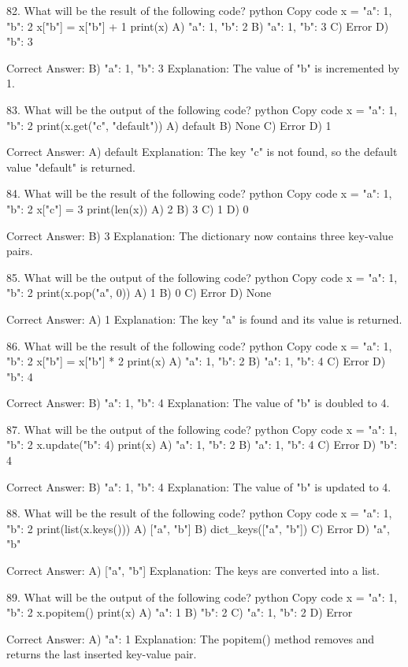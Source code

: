 82. What will be the result of the following code?
python
Copy code
x = {"a": 1, "b": 2}
x["b"] = x["b"] + 1
print(x)
A) {"a": 1, "b": 2}
B) {"a": 1, "b": 3}
C) Error
D) {"b": 3}

Correct Answer: B) {"a": 1, "b": 3}
Explanation: The value of "b" is incremented by 1.

83. What will be the output of the following code?
python
Copy code
x = {"a": 1, "b": 2}
print(x.get("c", "default"))
A) default
B) None
C) Error
D) 1

Correct Answer: A) default
Explanation: The key "c" is not found, so the default value "default" is returned.

84. What will be the result of the following code?
python
Copy code
x = {"a": 1, "b": 2}
x["c"] = 3
print(len(x))
A) 2
B) 3
C) 1
D) 0

Correct Answer: B) 3
Explanation: The dictionary now contains three key-value pairs.

85. What will be the output of the following code?
python
Copy code
x = {"a": 1, "b": 2}
print(x.pop("a", 0))
A) 1
B) 0
C) Error
D) None

Correct Answer: A) 1
Explanation: The key "a" is found and its value is returned.

86. What will be the result of the following code?
python
Copy code
x = {"a": 1, "b": 2}
x["b"] = x["b"] * 2
print(x)
A) {"a": 1, "b": 2}
B) {"a": 1, "b": 4}
C) Error
D) {"b": 4}

Correct Answer: B) {"a": 1, "b": 4}
Explanation: The value of "b" is doubled to 4.

87. What will be the output of the following code?
python
Copy code
x = {"a": 1, "b": 2}
x.update({"b": 4})
print(x)
A) {"a": 1, "b": 2}
B) {"a": 1, "b": 4}
C) Error
D) {"b": 4}

Correct Answer: B) {"a": 1, "b": 4}
Explanation: The value of "b" is updated to 4.

88. What will be the result of the following code?
python
Copy code
x = {"a": 1, "b": 2}
print(list(x.keys()))
A) ["a", "b"]
B) dict_keys(["a", "b"])
C) Error
D) {"a", "b"}

Correct Answer: A) ["a", "b"]
Explanation: The keys are converted into a list.

89. What will be the output of the following code?
python
Copy code
x = {"a": 1, "b": 2}
x.popitem()
print(x)
A) {"a": 1}
B) {"b": 2}
C) {"a": 1, "b": 2}
D) Error

Correct Answer: A) {"a": 1}
Explanation: The popitem() method removes and returns the last inserted key-value pair.


